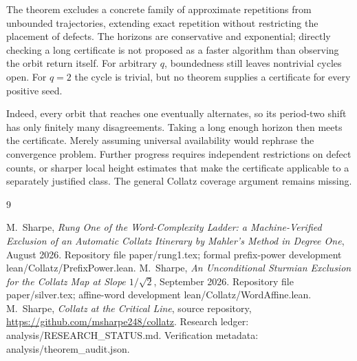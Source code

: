 \documentclass[11pt]{article}
\newcommand{\code}[1]{{\small\ttfamily #1}}
\begin{document}
The theorem excludes a concrete family of approximate repetitions from
unbounded trajectories, extending exact repetition without restricting
the placement of defects. The horizons are conservative and exponential;
directly checking a long certificate is not proposed as a faster
algorithm than observing the orbit return itself.
For arbitrary $q$, boundedness still leaves nontrivial cycles open.
For $q=2$ the cycle is trivial, but no theorem supplies a certificate
for every positive seed.

Indeed, every orbit that reaches one eventually alternates, so its
period-two shift has only finitely many disagreements. Taking a long
enough horizon then meets the certificate. Merely assuming universal
availability would rephrase the convergence problem. Further progress
requires independent restrictions on defect counts, or sharper local
height estimates that make the certificate applicable to a separately
justified class. The general Collatz coverage argument remains missing.

\begin{thebibliography}{9}
\raggedright
{} M.~Sharpe, \emph{Rung One of the Word-Complexity Ladder:
a Machine-Verified Exclusion of an Automatic Collatz Itinerary by
Mahler's Method in Degree One}, August 2026.
Repository file \code{paper/rung1.tex}; formal prefix-power development
\code{lean/Collatz/PrefixPower.lean}.
 M.~Sharpe, \emph{An Unconditional Sturmian Exclusion for
the Collatz Map at Slope $1/\sqrt2$}, September 2026.
Repository file \code{paper/silver.tex}; affine-word development
\code{lean/Collatz/WordAffine.lean}.
 M.~Sharpe, \emph{Collatz at the Critical Line}, source
repository, \url{https://github.com/msharpe248/collatz}.
Research ledger: \code{analysis/RESEARCH\_\allowbreak{}STATUS.md}.
Verification metadata: \code{analysis/theorem\_\allowbreak{}audit.json}.
\end{thebibliography}
\end{document}
